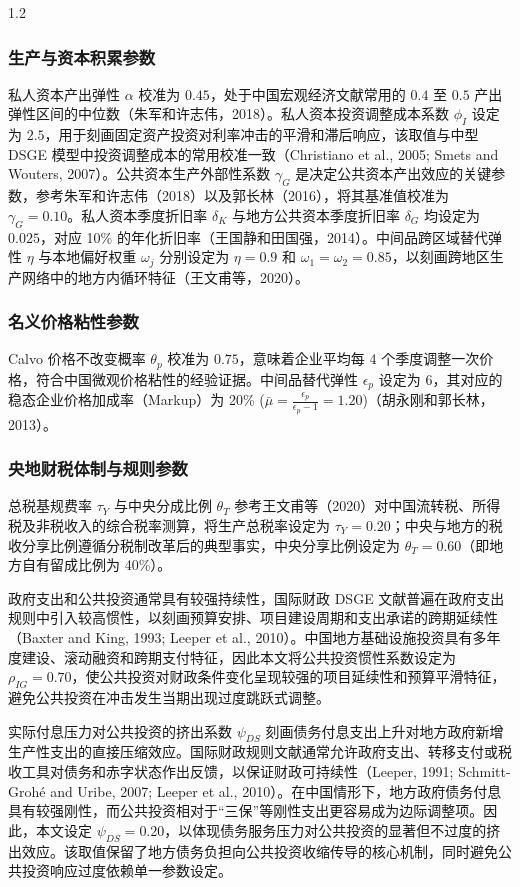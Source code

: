 \documentclass[12pt,UTF8]{ctexart}
\begin{document}
\begin{spacing}{1.2}
		\subsubsection{生产与资本积累参数}
		私人资本产出弹性 $\alpha$ 校准为 $0.45$，处于中国宏观经济文献常用的 $0.4$ 至 $0.5$ 产出弹性区间的中位数（朱军和许志伟，2018）。私人资本投资调整成本系数 $\phi_I$ 设定为 $2.5$，用于刻画固定资产投资对利率冲击的平滑和滞后响应，该取值与中型 DSGE 模型中投资调整成本的常用校准一致（Christiano et al., 2005; Smets and Wouters, 2007）。公共资本生产外部性系数 $\gamma_G$ 是决定公共资本产出效应的关键参数，参考朱军和许志伟（2018）以及郭长林（2016），将其基准值校准为 $\gamma_G = 0.10$。私人资本季度折旧率 $\delta_K$ 与地方公共资本季度折旧率 $\delta_G$ 均设定为 $0.025$，对应 10\% 的年化折旧率（王国静和田国强，2014）。中间品跨区域替代弹性 $\eta$ 与本地偏好权重 $\omega_j$ 分别设定为 $\eta = 0.9$ 和 $\omega_1 = \omega_2 = 0.85$，以刻画跨地区生产网络中的地方内循环特征（王文甫等，2020）。
		
		\subsubsection{名义价格粘性参数}
		Calvo 价格不改变概率 $\theta_p$ 校准为 $0.75$，意味着企业平均每 4 个季度调整一次价格，符合中国微观价格粘性的经验证据。中间品替代弹性 $\epsilon_p$ 设定为 $6$，其对应的稳态企业价格加成率（Markup）为 20\% ($\bar{\mu} = \frac{\epsilon_p}{\epsilon_p-1} = 1.20$)（胡永刚和郭长林，2013）。
		
		\subsubsection{央地财税体制与规则参数}
		总税基规费率 $\tau_Y$ 与中央分成比例 $\theta_T$ 参考王文甫等（2020）对中国流转税、所得税及非税收入的综合税率测算，将生产总税率设定为 $\tau_Y = 0.20$；中央与地方的税收分享比例遵循分税制改革后的典型事实，中央分享比例设定为 $\theta_T = 0.60$（即地方自有留成比例为 40\%）。
		
		政府支出和公共投资通常具有较强持续性，国际财政 DSGE 文献普遍在政府支出规则中引入较高惯性，以刻画预算安排、项目建设周期和支出承诺的跨期延续性（Baxter and King, 1993; Leeper et al., 2010）。中国地方基础设施投资具有多年度建设、滚动融资和跨期支付特征，因此本文将公共投资惯性系数设定为 $\rho_{IG}=0.70$，使公共投资对财政条件变化呈现较强的项目延续性和预算平滑特征，避免公共投资在冲击发生当期出现过度跳跃式调整。
		
		实际付息压力对公共投资的挤出系数 $\psi_{DS}$ 刻画债务付息支出上升对地方政府新增生产性支出的直接压缩效应。国际财政规则文献通常允许政府支出、转移支付或税收工具对债务和赤字状态作出反馈，以保证财政可持续性（Leeper, 1991; Schmitt-Grohé and Uribe, 2007; Leeper et al., 2010）。在中国情形下，地方政府债务付息具有较强刚性，而公共投资相对于“三保”等刚性支出更容易成为边际调整项。因此，本文设定 $\psi_{DS}=0.20$，以体现债务服务压力对公共投资的显著但不过度的挤出效应。该取值保留了地方债务负担向公共投资收缩传导的核心机制，同时避免公共投资响应过度依赖单一参数设定。
		

\end{spacing}
\end{document}
